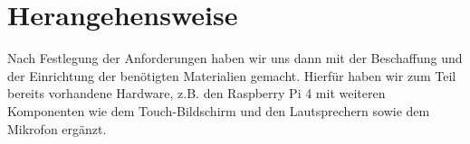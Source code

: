 \section{Herangehensweise}
Nach Festlegung der Anforderungen haben wir uns dann mit der Beschaffung und der Einrichtung der benötigten Materialien gemacht. Hierfür haben wir zum Teil bereits vorhandene Hardware, z.B. den Raspberry Pi 4 mit weiteren Komponenten wie dem Touch-Bildschirm und den Lautsprechern sowie dem Mikrofon ergänzt.


\newpage